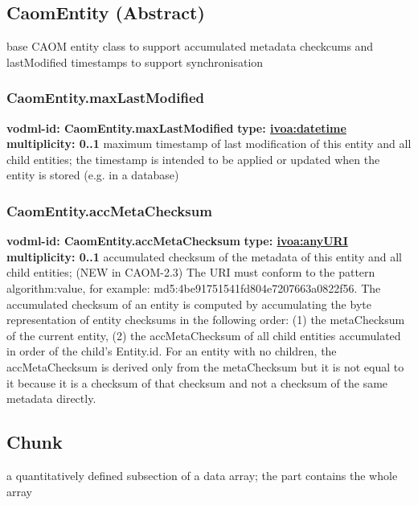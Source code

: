   \subsection{CaomEntity (Abstract)}
  \label{sect:CaomEntity}
    base CAOM entity class to support accumulated metadata checkcums and lastModified timestamps to support synchronisation

    \subsubsection{CaomEntity.maxLastModified}
      \textbf{vodml-id: CaomEntity.maxLastModified} \newline
      \textbf{type: \hyperref[sect:ivoa]{ivoa:datetime}} \newline
      \textbf{multiplicity: 0..1} \newline
      maximum timestamp of last modification of this entity and all child entities; the timestamp is intended to be applied or updated when the entity is stored (e.g. in a database)

    \subsubsection{CaomEntity.accMetaChecksum}
      \textbf{vodml-id: CaomEntity.accMetaChecksum} \newline
      \textbf{type: \hyperref[sect:ivoa]{ivoa:anyURI}} \newline
      \textbf{multiplicity: 0..1} \newline
      accumulated checksum of the metadata of this entity and all child entities; (NEW in CAOM-2.3) The URI must conform to the pattern {algorithm}:{value}, for example: md5:4be91751541fd804e7207663a0822f56. The accumulated checksum of an entity is computed by accumulating the byte representation of entity checksums in the following order: (1) the metaChecksum of the current entity, (2) the accMetaChecksum of all child entities accumulated in order of the child's Entity.id. For an entity with no children, the accMetaChecksum is derived only from the metaChecksum but it is not equal to it because it is a checksum of that checksum and not a checksum of the same metadata directly.

  \subsection{Chunk}
  \label{sect:Chunk}
    a quantitatively defined subsection of a data array; the part contains the whole array

